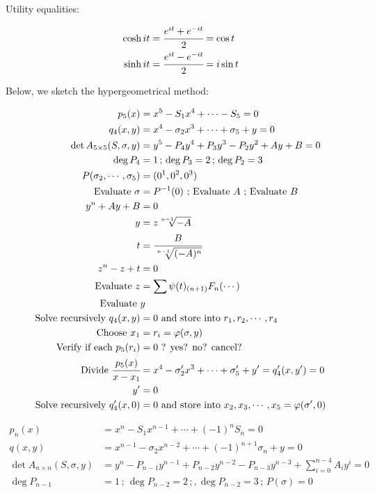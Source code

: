 \documentclass[12pt,a4paper]{article}
\begin{document}
Utility equalities:

\begin{align}
\cosh it &= \cfrac{e^{it} + e^{-it}}{2} = \cos t \\
\sinh it &= \cfrac{e^{it} - e^{-it}}{2} = i \sin t
\end{align}

Below, we sketch the hypergeometrical method:

\begin{align}
p_5(x) &= x^5 - S_1 x^4 + \cdots - S_5 = 0 \\
q_4(x,y) &= x^4 - \sigma_2 x^3 + \cdots + \sigma_5 + y = 0 \\
\det A_{5 \times 5}(S, \sigma, y) &= y^5 - P_4 y^4 + P_3 y^3 - P_2 y^2 + Ay + B = 0 \\
\deg P_4 &= 1\,;\,\deg P_3 = 2\,;\,\deg P_2 = 3 \\
P(\sigma_2, \cdots, \sigma_5) &= (0^1, 0^2,0^3) \\
\text{Evaluate }\sigma &= P^{-1}(0)\text{ ; Evaluate }A\text{ ; Evaluate }B \\
y^n + Ay + B &= 0 \\
y &= z \sqrt[n - 1]{-A} \\
t &= \cfrac{B}{\sqrt[n-1]{(-A)^n}} \\
z^n - z + t &= 0 \\
\text{Evaluate }z &= \sum \psi(t)_{(n + 1)}F_n(\cdots) \\
\text{Evaluate }&y \\
\text{Solve recursively }q_4(x, y) &= 0\text{ and store into }r_1, r_2, \cdots, r_4 \\
\text{Choose }x_1 &= r_i = \varphi(\sigma, y) \\
\text{Verify if each }p_5(r_i) &= 0\text{ ? yes? no? cancel?} \\
\text{Divide }\cfrac{p_5(x)}{x - x_1} &= x^4 - \sigma_2' x^3 + \cdots + \sigma_5' + y' = q_4'(x,y') = 0 \\
y' &= 0 \\
\text{Solve recursively }q_4'(x, 0) &= 0\text{ and store into }x_2, x_3, \cdots, x_5 = \varphi(\sigma', 0)
\end{align}

\begin{align}
p_n(x) &= x^n - S_1 x^{n - 1} + \cdots + (-1)^n S_n = 0 \\
q(x,y) &= x^{n - 1} - \sigma_2 x^{n - 2} + \cdots + (-1)^{n + 1} \sigma_n + y = 0 \\
\det A_{n \times n}(S, \sigma, y) &= y^n - P_{n - 1} y^{n - 1} + P_{n - 2} y^{n - 2} - P_{n - 3} y^{n - 3} + \sum_{i = 0}^{n - 4} A_i y^i = 0 \\
\deg P_{n - 1} &= 1\,;\,\deg P_{n - 2} = 2\,;,\deg P_{n - 2} = 3\,;\,P(\sigma) = 0
\end{align}
\end{document}
